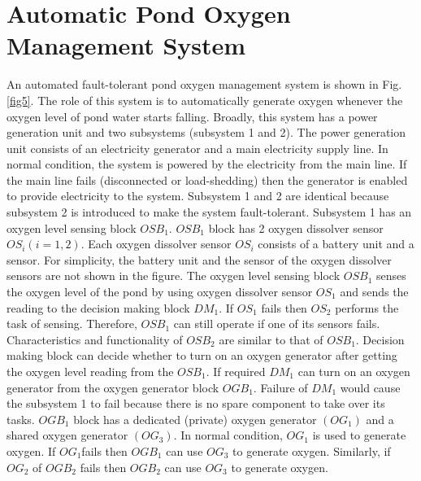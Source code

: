 \documentclass[10pt]{llncs}
\begin{document}
\section{Automatic Pond Oxygen Management System}
\label{sec:3}
An automated fault-tolerant pond oxygen management system is shown in Fig.\ref{fig5}. The role of this system is to automatically generate oxygen whenever the oxygen level of pond water starts falling. Broadly, this system has a power generation unit and two subsystems (subsystem 1 and 2). The power generation unit consists of an electricity generator and a main electricity supply line. In normal condition, the system is powered by the electricity from the main line. If the main line fails (disconnected or load-shedding) then the generator is enabled to provide electricity to the system. Subsystem 1 and 2 are identical because subsystem 2 is introduced to make the system fault-tolerant. 
Subsystem 1 has an oxygen level sensing block ${OSB}_1$. ${OSB}_1$ block has 2 oxygen dissolver sensor ${OS}_i \left(i=1,2\right)$. Each oxygen dissolver sensor ${OS}_i$ consists of a battery unit and a sensor. For simplicity, the battery unit and the sensor of the oxygen dissolver sensors are not shown in the figure. The oxygen level sensing block ${OSB}_1$ senses the oxygen level of the pond by using oxygen dissolver sensor ${OS}_1$ and sends the reading to the decision making block ${DM}_1 $. If  ${OS}_1$ fails then ${OS}_2$  performs the task of sensing. Therefore, ${OSB}_1$ can still operate if one of its sensors fails. Characteristics and functionality of ${OSB}_2$ are similar to that of ${OSB}_1$. Decision making block can decide whether to turn on an oxygen generator after getting the oxygen level reading from the ${OSB}_1$. If required ${DM}_1$ can turn on an oxygen generator from the oxygen generator block ${OGB}_1$. Failure of ${DM}_1$ would cause the subsystem 1 to fail because there is no spare component to take over its tasks. ${OGB}_1$ block has a dedicated (private) oxygen generator $\left({OG}_1\right)$ and a shared oxygen generator $\left({OG}_3\right)$. In normal condition, ${OG}_1$ is used to generate oxygen. If  ${OG}_1$fails then  ${OGB}_1$ can use ${OG}_3$ to generate oxygen. Similarly, if ${OG}_2$ of ${OGB}_2$ fails then ${OGB}_2$ can use ${OG}_3$ to generate oxygen.   
\end{document}

